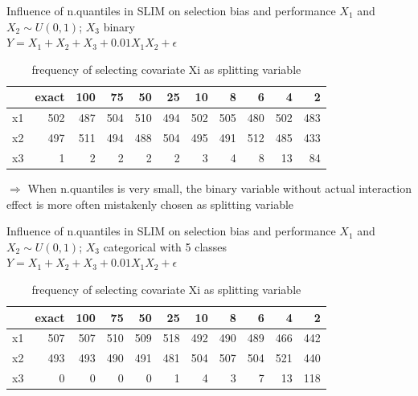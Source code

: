 \documentclass[9pt, xcolor=table]{beamer}
\begin{document}
\begin{frame}{Influence of n.quantiles in SLIM on selection bias and performance}
$X_1$ and $X_2 \sim U(0,1)$; $X_3$ binary\\
$Y = X_1 + X_2 + X_3 + 0.01X_1X_2 + \epsilon$

\begin{table}

\caption{frequency of selecting covariate Xi as splitting variable}
\centering
\begin{tabular}[t]{l|r|r|r|r|r|r|r|r|r|r}
\hline
  & exact & 100 & 75 & 50 & 25 & 10 & 8 & 6 & 4 & 2\\
\hline
x1 & 502 & 487 & 504 & 510 & 494 & 502 & 505 & 480 & 502 & 483\\
\hline
x2 & 497 & 511 & 494 & 488 & 504 & 495 & 491 & 512 & 485 & 433\\
\hline
x3 & 1 & 2 & 2 & 2 & 2 & 3 & 4 & 8 & 13 & 84\\
\hline
\end{tabular}
\end{table}

$\Rightarrow$ When n.quantiles is very small, the binary variable without actual interaction effect is more often mistakenly chosen as splitting variable

\end{frame}

\begin{frame}{Influence of n.quantiles in SLIM on selection bias and performance}
$X_1$ and $X_2 \sim U(0,1)$; $X_3$ categorical with 5 classes\\
$Y = X_1 + X_2 + X_3 + 0.01X_1X_2 + \epsilon$

\begin{table}

\caption{frequency of selecting covariate Xi as splitting variable}
\centering
\begin{tabular}[t]{l|r|r|r|r|r|r|r|r|r|r}
\hline
  & exact & 100 & 75 & 50 & 25 & 10 & 8 & 6 & 4 & 2\\
\hline
x1 & 507 & 507 & 510 & 509 & 518 & 492 & 490 & 489 & 466 & 442\\
\hline
x2 & 493 & 493 & 490 & 491 & 481 & 504 & 507 & 504 & 521 & 440\\
\hline
x3 & 0 & 0 & 0 & 0 & 1 & 4 & 3 & 7 & 13 & 118\\
\hline
\end{tabular}
\end{table}
\end{frame}
\end{document}
